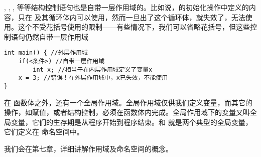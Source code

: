 \lstinline@if@, \lstinline@else@, \lstinline@for@, \lstinline@while@ 等等结构控制语句也是自带一层作用域的。比如说，\lstinline@for@ 的初始化操作中定义的内容，只在 \lstinline@for@ 及其循环体内可以使用，然而一旦出了这个循环体，\lstinline@i@ 就失效了，无法使用。这个不受花括号使用的限制——有些情况下，我们可以省略花括号，但这些控制语句仍然自带一层作用域
\begin{lstlisting}
int main() { //外层作用域
    if(<条件>) //自带一层作用域
        int x; //相当于在内层作用域定义了变量x
    x = 3; //错误！在外层作用域中，x已失效，不能使用
}
\end{lstlisting}\par
在 \lstinline@main@ 函数体之外，还有一个全局作用域。全局作用域仅供我们定义变量，而其它的操作，如赋值，或者结构控制，必须在函数体内完成。全局作用域下的变量又叫全局变量，它们的生存期是从程序开始到程序结束。\lstinline@cin@ 和 \lstinline@cout@ 就是两个典型的全局变量，它们定义在 \lstinline@std@ 命名空间中。\par
我们会在第七章，详细讲解作用域及命名空间的概念。\par
